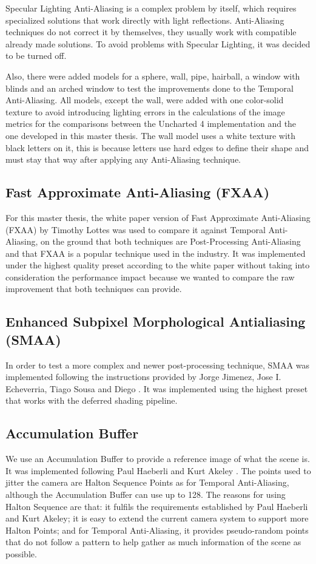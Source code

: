 \documentclass{cslthse-msc}
\begin{document}
Specular Lighting Anti-Aliasing is a complex problem by itself, which requires specialized solutions that work directly with light reflections. Anti-Aliasing techniques do not correct it by themselves, they usually work with compatible already made solutions. To avoid problems with Specular Lighting, it was decided to be turned off.

Also, there were added models for a sphere, wall, pipe, hairball, a window with blinds and an arched window to test the improvements done to the Temporal Anti-Aliasing. All models, except the wall, were added with one color-solid texture to avoid introducing lighting errors in the calculations of the image metrics for the comparisons between the Uncharted 4 implementation and the one developed in this master thesis. The wall model uses a white texture with black letters on it, this is because letters use hard edges to define their shape and must stay that way after applying any Anti-Aliasing technique.

\subsection{Fast Approximate Anti-Aliasing (FXAA)}
For this master thesis, the white paper version of Fast Approximate Anti-Aliasing (FXAA) by Timothy Lottes \cite{Lottes2009} was used to compare it against Temporal Anti-Aliasing, on the ground that both techniques are Post-Processing Anti-Aliasing and that FXAA is a popular technique used in the industry. It was implemented  under the highest quality preset according to the white paper without taking into consideration the performance impact because we wanted to compare the raw improvement that both techniques can provide.

\subsection{Enhanced Subpixel Morphological Antialiasing (SMAA)}
In order to test a more complex and newer post-processing technique, SMAA was implemented following the instructions provided by Jorge Jimenez, Jose I. Echeverria, Tiago Sousa and Diego \cite{Jimenez2012}. It was implemented using the highest     preset that works with the deferred shading pipeline.

\subsection{Accumulation Buffer}
We use an Accumulation Buffer to provide a reference image of what the scene is. It was implemented following Paul Haeberli and Kurt Akeley \cite{Haeberli1990}. The points used to jitter the camera are Halton Sequence Points as for Temporal Anti-Aliasing, although the Accumulation Buffer can use up to 128. The reasons for using Halton Sequence are that: it fulfils the requirements established by Paul Haeberli and Kurt Akeley; it is easy to extend the current camera system to support more Halton Points; and for Temporal Anti-Aliasing, it provides pseudo-random points that do not follow a pattern to help gather as much information of the scene as possible.
\end{document}
